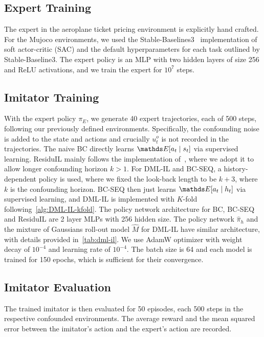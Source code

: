 \subsection{Expert Training}

The expert in the aeroplane ticket pricing environment is explicitly hand crafted. For the Mujoco environments, we used the Stable-Baselines3~\citep{stable-baselines3} implementation of soft actor-critic (SAC) and the default hyperparameters for each task outlined by Stable-Baseline3. The expert policy is an MLP with two hidden layers of size 256 and ReLU activations, and we train the expert for $10^7$ steps.


\subsection{Imitator Training}

With the expert policy $\pi_E$, we generate 40 expert trajectories, each of 500 steps, following our previously defined environments. Specifically, the confounding noise is added to the state and actions and crucially $u^o_t$ is not recorded in the trajectories. The naive BC directly learns $\expectE[a_t\mid s_t]$ via supervised learning. ResiduIL mainly follows the implementation of~\citet{Swamy2022_temporal}, where we adopt it to allow longer confounding horizon $k>1$. For DML-IL and BC-SEQ, a history-dependent policy is used, where we fixed the look-back length to be $k+3$, where $k$ is the confounding horizon. BC-SEQ then just learns $\expectE[a_t\mid h_t]$ via supervised learning, and DML-IL is implemented with $K$-fold following~\cref{alg:DML-IL-kfold}. The policy network architecture for BC, BC-SEQ and ResiduIL are 2 layer MLPs with 256 hidden size. The policy network $\hat{\pi}_h$ and the mixture of Gaussians roll-out model $\hat{M}$ for DML-IL have similar architecture, with details provided in~\cref{tab:dml-il}. We use AdamW optimizer with weight decay of $10^{-4}$ and learning rate of $10^{-4}$. The batch size is 64 and each model is trained for 150 epochs, which is sufficient for their convergence.

\subsection{Imitator Evaluation}

The trained imitator is then evaluated for 50 episodes, each 500 steps in the respective confounded environments. The average reward and the mean squared error between the imitator's action and the expert's action are recorded.


